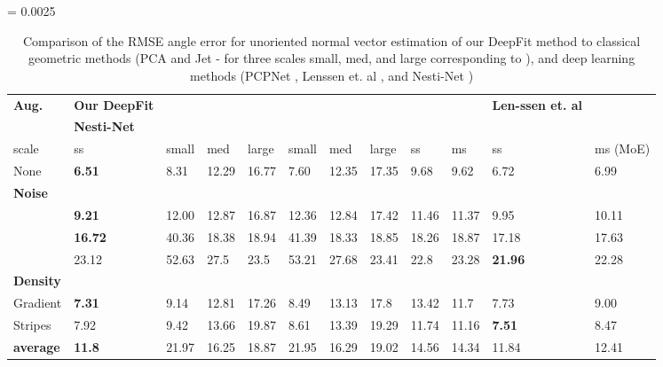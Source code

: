 \begin{table*} 
	\centering	
		\tabcolsep = 0.0025\textwidth
		\begin{tabular}{| M{0.12\textwidth} | M{0.10\textwidth} | M{0.06\textwidth} | M{0.06\textwidth}| M{0.06\textwidth} | M{0.06\textwidth}|
		M{0.06\textwidth}| M{0.06\textwidth} | M{0.06\textwidth}|  M{0.07\textwidth} | M{0.08\textwidth} | M{0.12\textwidth} |} 
			\hline
			\centering\textbf{Aug.}  & \centering\textbf{Our DeepFit}  &   &
			 & 	 & \centering\textbf{Len-ssen et. al} \\ \cite{lenssen2019differentiable} & \centering\textbf{Nesti-Net}
 			\tabularnewline
 			\hline
 			scale &ss&small&med&large&small&med&large&ss&ms&ss&ms (MoE)\\
 		    None               &\textbf{6.51}&8.31&12.29&16.77&7.60&12.35&17.35&9.68&9.62&6.72&6.99\\
 		    \hline
 			\textbf{Noise }     &&&&&&&&&&& \\
 			 &\textbf{9.21}&12.00&12.87&16.87&12.36&12.84&17.42&11.46&11.37&9.95&10.11\\
 			   &\textbf{16.72}&40.36&18.38&18.94&41.39&18.33&18.85&18.26&18.87&17.18&17.63\\
 			   &23.12&52.63&27.5 &23.5 &53.21&27.68&23.41&22.8&23.28&\textbf{21.96}&22.28\\
		    \hline
		    \textbf{Density}   &&&&&&&&&&& \\
		    Gradient           &\textbf{7.31}&9.14&12.81&17.26&8.49&13.13&17.8&13.42&11.7 &7.73&9.00\\
		    Stripes            &7.92&9.42&13.66&19.87&8.61&13.39&19.29&11.74&11.16&\textbf{7.51}&8.47\\
		    \hline
		    \textbf{average}   &\textbf{11.8}&21.97&16.25&18.87&21.95&16.29&19.02&14.56&14.34&11.84&12.41 \\
		    \hline
		\end{tabular}
	\caption{Comparison of the RMSE angle error for unoriented normal vector estimation of our DeepFit method to classical geometric methods (PCA \cite{hoppe1992surface} and Jet \cite{cazals2005estimating} - for three scales small, med, and large corresponding to ), and deep learning methods (PCPNet \cite{guerrero2018pcpnet}, Lenssen et. al \cite{lenssen2019differentiable}, and Nesti-Net \cite{ben2019nesti})}
	\label{table:results:baselines}
\end{table*} 


